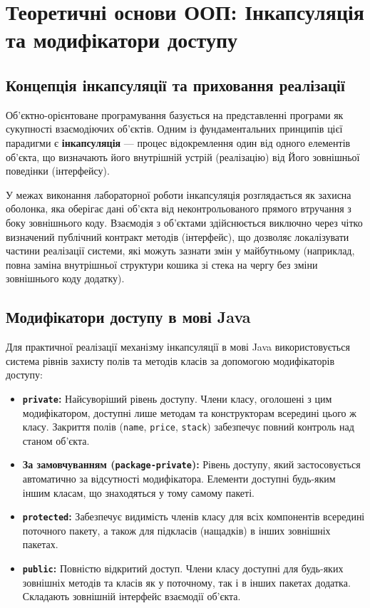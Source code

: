 \section{Теоретичні основи ООП: Інкапсуляція та модифікатори доступу}

\subsection{Концепція інкапсуляції та приховання реалізації}

Об'єктно-орієнтоване програмування базується на представленні програми як сукупності 
взаємодіючих об'єктів. Одним із фундаментальних принципів цієї парадигми 
є \textbf{інкапсуляція} — процес відокремлення один від одного елементів об'єкта, 
що визначають його внутрішній устрій (реалізацію) від Його зовнішньої поведінки 
(інтерфейсу). 

У межах виконання лабораторної роботи інкапсуляція розглядається як захисна оболонка, 
яка оберігає дані об'єкта від неконтрольованого прямого втручання з боку зовнішнього коду. 
Взаємодія з об'єктами здійснюється виключно через чітко визначений публічний контракт 
методів (інтерфейс), що дозволяє локалізувати частини реалізації системи, які можуть 
зазнати змін у майбутньому (наприклад, повна заміна внутрішньої структури кошика зі 
стека на чергу без зміни зовнішнього коду додатку).

\subsection{Модифікатори доступу в мові Java}

Для практичної реалізації механізму інкапсуляції в мові Java використовується система 
рівнів захисту полів та методів класів за допомогою модифікаторів доступу:
\begin{itemize}
    \item \textbf{\texttt{private}:} 
    Найсуворіший рівень доступу. Члени класу, оголошені з цим модифікатором, доступні 
    лише методам та конструкторам всередині цього ж класу. Закриття полів (\texttt{name}, 
    \texttt{price}, \texttt{stack}) забезпечує повний контроль над станом об'єкта.
    \item \textbf{За замовчуванням (\texttt{package-private}):} 
    Рівень доступу, який застосовується автоматично за відсутності модифікатора. 
    Елементи доступні будь-яким іншим класам, що знаходяться у тому самому пакеті.
    \item \textbf{\texttt{protected}:} 
    Забезпечує видимість членів класу для всіх компонентів всередині поточного пакету, 
    а також для підкласів (нащадків) в інших зовнішніх пакетах.
    \item \textbf{\texttt{public}:} 
    Повністю відкритий доступ. Члени класу доступні для будь-яких зовнішніх методів 
    та класів як у поточному, так і в інших пакетах додатка. Складають зовнішній інтерфейс 
    взаємодії об'єкта.
\end{itemize}

